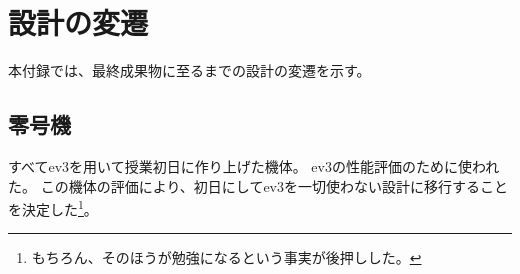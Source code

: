 \documentclass{ltjsreport}
\begin{document}






\appendix






\chapter{設計の変遷}
本付録では、最終成果物に至るまでの設計の変遷を示す。

\section{零号機}
すべてev3を用いて授業初日に作り上げた機体。
ev3の性能評価のために使われた。
この機体の評価により、初日にしてev3を一切使わない設計に移行することを決定した\footnote{もちろん、そのほうが勉強になるという事実が後押しした。}。
\end{document}
